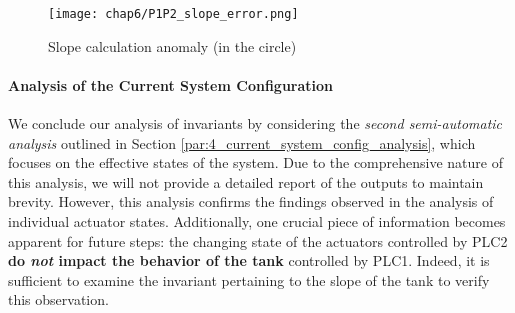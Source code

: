 \begin{figure}[ht]
	\centering
	\texttt{[image: chap6/P1P2\_slope\_error.png]}
	\caption{Slope calculation anomaly (in the circle)}
	\label{fig:6_P1P2_slope_fail}
\end{figure}

\paragraph{Analysis of the Current System Configuration}
\label{par:6_P1P2_current_system_conf}
We conclude our analysis of invariants by considering the \textit{second semi-automatic analysis} outlined in Section \ref{par:4_current_system_config_analysis}, which focuses on the effective states of the system. Due to the comprehensive nature of this analysis, we will not provide a detailed report of the outputs to maintain brevity. However, this analysis confirms the findings observed in the analysis of individual actuator states. Additionally, one crucial piece of information becomes apparent for future steps: the changing state of the actuators controlled by PLC2 \textbf{do \textit{not} impact the behavior of the tank} controlled by PLC1. Indeed, it is sufficient to examine the invariant pertaining to the slope of the tank to verify this observation.

\begin{comment}
\paragraph{Conjecture summarizing}
We summarize in Table \ref{table:6_P1P2_summarize_invariants} the conjectures made in this phase:

\bigskip
{	\footnotesize
	\begin{longtable}[l]{p{0.05\textwidth} p{0.45\textwidth} p{0.45\textwidth}}
		\hline
		\textbf{\#} & \textbf{Statement} & \textbf{Reason} \\
		\hline
		
		C30 & \texttt{P2\_P203} and \texttt{P2\_P205} always have the same values. & Observation derived from the general invariants.\\
		\hline
		
		C31 & Actuators controlled by PLC2 do \textit{not} impact the behavior of \texttt{P1\_LIT101}. & Observation derived from the analysis of the current system configuration.\\
		\hline
		
	\caption{}
	\label{table:6_P1P2_summarize_invariants}
	\end{longtable}
}
\end{comment}

